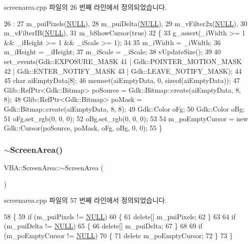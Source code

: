 screenarea.\+cpp 파일의 26 번째 라인에서 정의되었습니다.


\begin{DoxyCode}
26                                                              :
27   m\_puiPixels(\mbox{\hyperlink{getopt1_8c_a070d2ce7b6bb7e5c05602aa8c308d0c4}{NULL}}),
28   m\_puiDelta(\mbox{\hyperlink{getopt1_8c_a070d2ce7b6bb7e5c05602aa8c308d0c4}{NULL}}),
29   m\_vFilter2x(\mbox{\hyperlink{getopt1_8c_a070d2ce7b6bb7e5c05602aa8c308d0c4}{NULL}}),
30   m\_vFilterIB(\mbox{\hyperlink{getopt1_8c_a070d2ce7b6bb7e5c05602aa8c308d0c4}{NULL}}),
31   m\_bShowCursor(\textcolor{keyword}{true})
32 \{
33   g\_assert(\_iWidth >= 1 && \_iHeight >= 1 && \_iScale >= 1);
34 
35   m\_iWidth  = \_iWidth;
36   m\_iHeight = \_iHeight;
37   m\_iScale  = \_iScale;
38   vUpdateSize();
39 
40   set\_events(Gdk::EXPOSURE\_MASK
41              | Gdk::POINTER\_MOTION\_MASK
42              | Gdk::ENTER\_NOTIFY\_MASK
43              | Gdk::LEAVE\_NOTIFY\_MASK);
44 
45   \textcolor{keywordtype}{char} aiEmptyData[8];
46   memset(aiEmptyData, 0, \textcolor{keyword}{sizeof}(aiEmptyData));
47   Glib::RefPtr<Gdk::Bitmap> poSource = Gdk::Bitmap::create(aiEmptyData, 8, 8);
48   Glib::RefPtr<Gdk::Bitmap> poMask = Gdk::Bitmap::create(aiEmptyData, 8, 8);
49   Gdk::Color oFg;
50   Gdk::Color oBg;
51   oFg.set\_rgb(0, 0, 0);
52   oBg.set\_rgb(0, 0, 0);
53 
54   m\_poEmptyCursor = \textcolor{keyword}{new} Gdk::Cursor(poSource, poMask, oFg, oBg, 0, 0);
55 \}
\end{DoxyCode}
\mbox{\label{class_v_b_a_1_1_screen_area_a3256c9d53615bdf68d84b11e29f725cd}} 
\subsubsection{\texorpdfstring{$\sim$\+Screen\+Area()}{~ScreenArea()}}
{\footnotesize\ttfamily V\+B\+A\+::\+Screen\+Area\+::$\sim$\+Screen\+Area (\begin{DoxyParamCaption}{ }\end{DoxyParamCaption})\hspace{0.3cm}{\ttfamily [virtual]}}



screenarea.\+cpp 파일의 57 번째 라인에서 정의되었습니다.


\begin{DoxyCode}
58 \{
59   \textcolor{keywordflow}{if} (m\_puiPixels != \mbox{\hyperlink{getopt1_8c_a070d2ce7b6bb7e5c05602aa8c308d0c4}{NULL}})
60   \{
61     \textcolor{keyword}{delete}[] m\_puiPixels;
62   \}
63 
64   \textcolor{keywordflow}{if} (m\_puiDelta != \mbox{\hyperlink{getopt1_8c_a070d2ce7b6bb7e5c05602aa8c308d0c4}{NULL}})
65   \{
66     \textcolor{keyword}{delete}[] m\_puiDelta;
67   \}
68 
69   \textcolor{keywordflow}{if} (m\_poEmptyCursor != \mbox{\hyperlink{getopt1_8c_a070d2ce7b6bb7e5c05602aa8c308d0c4}{NULL}})
70   \{
71     \textcolor{keyword}{delete} m\_poEmptyCursor;
72   \}
73 \}
\end{DoxyCode}


